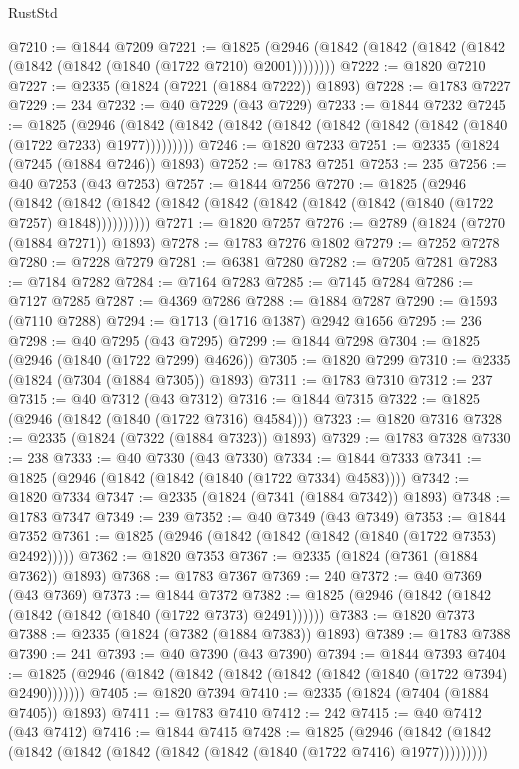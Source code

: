 \begin{lexlean}{RustStd}
\begin{coremodule}
@7210 := @1844 @7209
@7221 := @1825 (@2946 (@1842 (@1842 (@1842 (@1842 (@1842 (@1842 (@1840 (@1722 @7210) @2001))))))))
@7222 := @1820 @7210
@7227 := @2335 (@1824 (@7221 (@1884 @7222)) @1893)
@7228 := @1783 @7227
@7229 := 234
@7232 := @40 @7229 (@43 @7229)
@7233 := @1844 @7232
@7245 := @1825
    (@2946 (@1842 (@1842 (@1842 (@1842 (@1842 (@1842 (@1842 (@1840 (@1722 @7233) @1977)))))))))
@7246 := @1820 @7233
@7251 := @2335 (@1824 (@7245 (@1884 @7246)) @1893)
@7252 := @1783 @7251
@7253 := 235
@7256 := @40 @7253 (@43 @7253)
@7257 := @1844 @7256
@7270 := @1825
    (@2946
      (@1842 (@1842 (@1842 (@1842 (@1842 (@1842 (@1842 (@1842 (@1840 (@1722 @7257) @1848))))))))))
@7271 := @1820 @7257
@7276 := @2789 (@1824 (@7270 (@1884 @7271)) @1893)
@7278 := @1783 @7276 @1802
@7279 := @7252 @7278
@7280 := @7228 @7279
@7281 := @6381 @7280
@7282 := @7205 @7281
@7283 := @7184 @7282
@7284 := @7164 @7283
@7285 := @7145 @7284
@7286 := @7127 @7285
@7287 := @4369 @7286
@7288 := @1884 @7287
@7290 := @1593 (@7110 @7288)
@7294 := @1713 (@1716 @1387) @2942 @1656
@7295 := 236
@7298 := @40 @7295 (@43 @7295)
@7299 := @1844 @7298
@7304 := @1825 (@2946 (@1840 (@1722 @7299) @4626))
@7305 := @1820 @7299
@7310 := @2335 (@1824 (@7304 (@1884 @7305)) @1893)
@7311 := @1783 @7310
@7312 := 237
@7315 := @40 @7312 (@43 @7312)
@7316 := @1844 @7315
@7322 := @1825 (@2946 (@1842 (@1840 (@1722 @7316) @4584)))
@7323 := @1820 @7316
@7328 := @2335 (@1824 (@7322 (@1884 @7323)) @1893)
@7329 := @1783 @7328
@7330 := 238
@7333 := @40 @7330 (@43 @7330)
@7334 := @1844 @7333
@7341 := @1825 (@2946 (@1842 (@1842 (@1840 (@1722 @7334) @4583))))
@7342 := @1820 @7334
@7347 := @2335 (@1824 (@7341 (@1884 @7342)) @1893)
@7348 := @1783 @7347
@7349 := 239
@7352 := @40 @7349 (@43 @7349)
@7353 := @1844 @7352
@7361 := @1825 (@2946 (@1842 (@1842 (@1842 (@1840 (@1722 @7353) @2492)))))
@7362 := @1820 @7353
@7367 := @2335 (@1824 (@7361 (@1884 @7362)) @1893)
@7368 := @1783 @7367
@7369 := 240
@7372 := @40 @7369 (@43 @7369)
@7373 := @1844 @7372
@7382 := @1825 (@2946 (@1842 (@1842 (@1842 (@1842 (@1840 (@1722 @7373) @2491))))))
@7383 := @1820 @7373
@7388 := @2335 (@1824 (@7382 (@1884 @7383)) @1893)
@7389 := @1783 @7388
@7390 := 241
@7393 := @40 @7390 (@43 @7390)
@7394 := @1844 @7393
@7404 := @1825 (@2946 (@1842 (@1842 (@1842 (@1842 (@1842 (@1840 (@1722 @7394) @2490)))))))
@7405 := @1820 @7394
@7410 := @2335 (@1824 (@7404 (@1884 @7405)) @1893)
@7411 := @1783 @7410
@7412 := 242
@7415 := @40 @7412 (@43 @7412)
@7416 := @1844 @7415
@7428 := @1825
    (@2946 (@1842 (@1842 (@1842 (@1842 (@1842 (@1842 (@1842 (@1840 (@1722 @7416) @1977)))))))))

\end{coremodule}
\end{lexlean}
